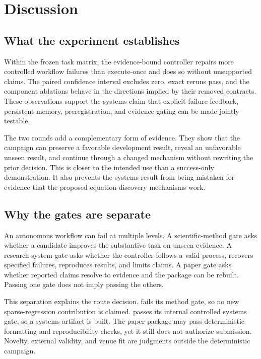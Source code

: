 \section{Discussion}

\subsection{What the experiment establishes}

Within the frozen task matrix, the evidence-bound controller repairs more
controlled workflow failures than execute-once and does so without unsupported
claims. The paired confidence interval excludes zero, exact reruns pass, and
the component ablations behave in the directions implied by their removed
contracts. These observations support the systems claim that explicit
failure feedback, persistent memory, preregistration, and evidence gating can
be made jointly testable.

The two \routea{} rounds add a complementary form of evidence. They show that
the campaign can preserve a favorable development result, reveal an
unfavorable unseen result, and continue through a changed mechanism without
rewriting the prior decision. This is closer to the intended use than a
success-only demonstration. It also prevents the systems result from being
mistaken for evidence that the proposed equation-discovery mechanisms work.

\subsection{Why the gates are separate}

An autonomous workflow can fail at multiple levels. A scientific-method gate
asks whether a candidate improves the substantive task on unseen evidence. A
research-system gate asks whether the controller follows a valid process,
recovers specified failures, reproduces results, and limits claims. A paper
gate asks whether reported claims resolve to evidence and the package can be
rebuilt. Passing one gate does not imply passing the others.

This separation explains the route decision. \routea{} fails its method gate,
so no new sparse-regression contribution is claimed. \routeb{} passes its
internal controlled systems gate, so a systems artifact is built. The paper
package may pass deterministic formatting and reproducibility checks, yet it
still does not authorize submission. Novelty, external validity, and venue
fit are judgments outside the deterministic campaign.

